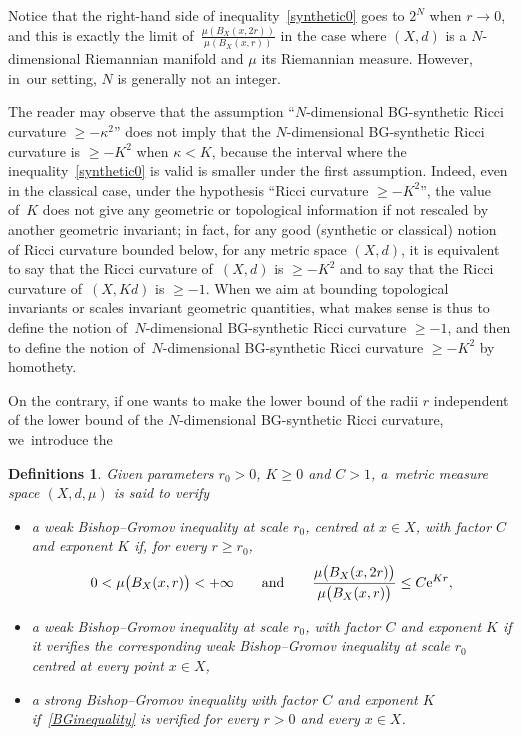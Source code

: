 \documentclass[10pt,a4paper]{amsart}
\numberwithin{equation}{section}
\newtheorem{defis}[theor]{Definitions}
\newcommand{\f}{\rightarrow}
\begin{document}
Notice that the right-hand side of inequality~\eqref{synthetic0} goes to $2^N$ when $r\f 0$, and this is exactly the limit of~$\frac{\mu (B_X(x, 2 r))}{\mu ( B_X(x,r))}$ in the case where $(X,d)$ is a $N$-dimensional Riemannian manifold and $\mu$ its Riemannian measure. However, in~our setting, $N$ is generally not an integer.

The reader may observe that the assumption ``$N$-dimensional BG-synthetic Ricci curvature \mbox{$\ge - \kappa^2$}'' does not imply that the $N$-dimensional
BG-synthetic Ricci curvature is $\ge - K^2$ when $\kappa < K$, because the interval where the inequality~\eqref{synthetic0} is valid is smaller under the first
assumption. Indeed, even in the classical case, under the hypothesis ``Ricci curvature $\ge -K^2$'', the value of~$K$ does not give any geometric or topological information if
not rescaled by ano\-ther geo\-met\-ric invariant; in fact, for any good (synthetic or classical) notion of Ricci curvature bounded below, for any metric space
$(X,d)$, it is equivalent to say that the Ricci curvature of~$(X,d)$ is $\ge - K^2$ and to say that the Ricci curvature of~$(X, K d)$ is $\ge - 1$. When we aim at
bounding topological invariants or scales invariant geometric quantities,
what makes sense is thus to define the notion of~$N$-dimensional BG-synthetic
Ricci curvature $\ge - 1$, and then to define the notion of~$N$-dimensional BG-synthetic Ricci curvature $\ge - K^2$ by homothety.

On the contrary, if one wants to make the lower bound of the radii $r$ independent of the lower bound of the $N$-dimensional
BG-synthetic Ricci curvature, we~introduce the


\begin{defis}\label{generalframe0}
Given parameters $r_0> 0$, $ K \ge 0$ and $ C > 1$, a~metric measure space $(X,d,\mu)$ is said to verify
\begin{itemize}\itemsep=0pt
\item[$(i)$]
a weak Bishop--Gromov inequality at scale $r_0$, centred at $x \in X$, with factor $C$ and exponent $K$ if, for every $r \ge r_0$,
\begin{gather}\label{BGinequality}
 0 < \mu \big(B_X(x, r)\big) < +\infty \qquad \text{and} \qquad \frac{\mu \big( B_X(x, 2 r)\big)}{\mu \big( B_X(x,r)\big)} \le C {\rm e}^{K r},
\end{gather}
\item[$(ii)$]
a weak Bishop--Gromov inequality at scale $r_0$, with factor $C$ and exponent $K$ if it verifies the
corresponding weak Bishop--Gromov inequality at scale $r_0$ centred at every point \mbox{$x \in X$},
\item[$(iii)$]
a strong Bishop--Gromov inequality with factor $C$ and exponent $K$ if~\eqref{BGinequality} is verified for every $r > 0$ and every $x \in X$.
\end{itemize}
\end{defis}
\end{document}
